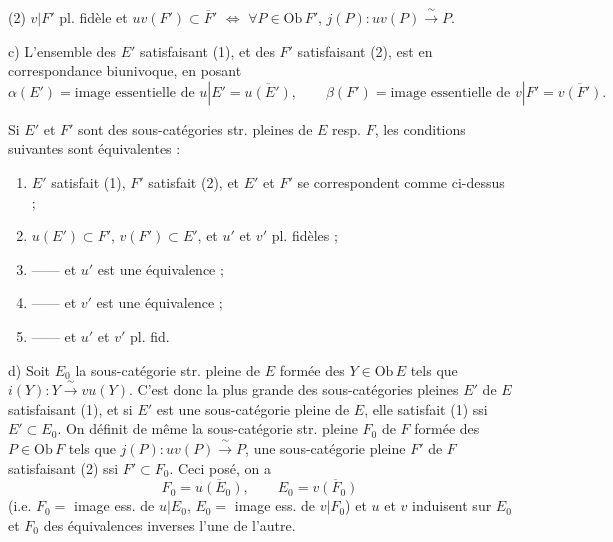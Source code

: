 \documentclass[11pt,a4paper]{article}
\begin{document}
(2) $v|F'$ pl. fidèle et $uv(F') \subset \overline{F}'$
$\iff$ $\forall P \in \mathrm{Ob}\,F'$, $j(P) : uv(P) \xrightarrow{\ \sim\ } P$.


c) L'ensemble des $E'$  satisfaisant (1), et des
$F'$  satisfaisant (2), est en correspondance
biunivoque, en posant
\[
\alpha(E') = \text{image essentielle de } u|E' = \overline{u(E')},
\qquad
\beta(F') = \text{image essentielle de } v|F' = \overline{v(F')}.
\]

Si $E'$ et $F'$ sont des sous-catégories str. pleines de $E$ resp. $F$, les
conditions suivantes sont équivalentes :

\begin{enumerate}
\item $E'$ satisfait (1), $F'$ satisfait (2), et $E'$ et $F'$ se
correspondent comme ci-dessus ;
\item $u(E') \subset F'$, $v(F') \subset E'$, et $u'$ et $v'$ pl. fidèles ;
\item —— et $u'$ est une équivalence ;
\item —— et $v'$ est une équivalence ;
\item —— et $u'$ et $v'$ pl. fid.
\end{enumerate}


d)  Soit $E_0$ la sous-catégorie str. pleine de
$E$ formée des $Y \in \mathrm{Ob}\,E$ tels que
$i(Y) : Y \xrightarrow{\ \sim\ } vu(Y)$. C'est donc la plus grande des
sous-catégories pleines $E'$ de $E$ satisfaisant (1), et si $E'$ est une
sous-catégorie pleine de $E$, elle satisfait (1) ssi $E' \subset E_0$. On
définit de même la sous-catégorie str. pleine $F_0$ de $F$ formée des
$P \in \mathrm{Ob}\,F$ tels que $j(P) : uv(P) \xrightarrow{\ \sim\ } P$, une
sous-catégorie pleine $F'$ de $F$ satisfaisant (2) ssi $F' \subset F_0$.
Ceci posé, on a
\[
F_0 = \overline{u(E_0)}, \qquad E_0 = \overline{v(F_0)}
\]
(i.e. $F_0 =$ image ess. de $u|E_0$, $E_0 =$ image ess. de $v|F_0$) et $u$
et $v$ induisent sur $E_0$ et $F_0$ des équivalences inverses l'une de
l'autre.
\end{document}
